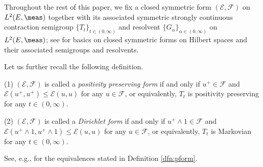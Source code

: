 %
%
%
%
%
Throughout the rest of this paper, we fix a closed symmetric form
$(\mathcal{E},\mathcal{F})$ on $L^{2}(E,\meas)$ together with
its associated symmetric strongly continuous contraction semigroup
$\{T_{t}\}_{t\in(0,\infty)}$ and resolvent $\{G_{\alpha}\}_{\alpha\in(0,\infty)}$
on $L^{2}(E,\meas)$; see \cite[Chapter 1.3]{FOT} for basics on closed
symmetric forms on Hilbert spaces and their associated semigroups and resolvents.

Let us further recall the following definition.
%
\begin{dfn}\label{dfn:pform}
\textup{(1)} $(\mathcal{E},\mathcal{F})$ is called a \emph{positivity preserving form}
if and only if $u^{+}\in\mathcal{F}$ and $\mathcal{E}(u^{+},u^{+})\leq\mathcal{E}(u,u)$
for any $u\in\mathcal{F}$, or equivalently,
$T_{t}$ is positivity preserving for any $t\in(0,\infty)$.

\noindent
\textup{(2)} $(\mathcal{E},\mathcal{F})$ is called a \emph{Dirichlet form} if and only if
$u^{+}\wedge 1\in\mathcal{F}$ and $\mathcal{E}(u^{+}\wedge 1,u^{+}\wedge 1)\leq\mathcal{E}(u,u)$
for any $u\in\mathcal{F}$, or equivalently,
$T_{t}$ is Markovian for any $t\in(0,\infty)$.
\end{dfn}
%
See, e.g., \cite[Section 2]{Ouh:PA96} for the equivalences stated in Definition \ref{dfn:pform}.

